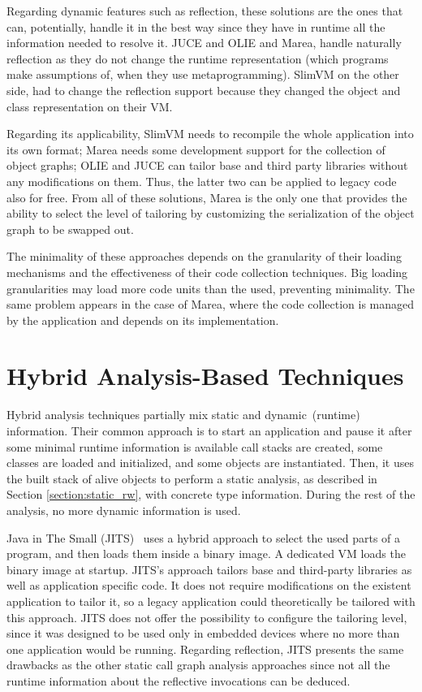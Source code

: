 Regarding dynamic features such as reflection, these solutions are the ones that can, potentially, handle it in the best way since they have in runtime all the information needed to resolve it. JUCE and OLIE and Marea, handle naturally reflection as they do not change the runtime representation (which programs make assumptions of, when they use metaprogramming). SlimVM on the other side, had to change the reflection support because they changed the object and class representation on their VM.

Regarding its applicability, SlimVM needs to recompile the whole application into its own format; Marea needs some development support for the collection of object graphs; OLIE and JUCE can tailor base and third party libraries without any modifications on them. Thus, the latter two can be applied to legacy code also for free. From all of these solutions, Marea is the only one that provides the ability to select the level of tailoring by customizing the serialization of the object graph to be swapped out.

The minimality of these approaches depends on the granularity of their loading mechanisms and the effectiveness of their code collection techniques. Big loading granularities may load more code units than the used, preventing minimality. The same problem appears in the case of Marea, where the code collection is managed by the application and depends on its implementation.

\section{Hybrid Analysis-Based Techniques}\label{section:hybrid_rw}

Hybrid analysis techniques partially mix static and dynamic~(\ie runtime) information. Their common approach is to start an application and pause it after some minimal runtime information is available \ie call stacks are created, some classes are loaded and initialized, and some objects are instantiated. Then, it uses the built stack of alive objects to perform a static analysis, as described in Section \ref{section:static_rw}, with concrete type information. During the rest of the analysis, no more dynamic information is used.

Java in The Small (JITS)~\cite{Cour10a} uses a hybrid approach to select the used parts of a program, and then loads them inside a binary image. A dedicated VM loads the binary image at startup. JITS's approach tailors base and third-party libraries as well as application specific code. It does not require modifications on the existent application to tailor it, so a legacy application could theoretically be tailored with this approach. JITS does not offer the possibility to configure the tailoring level, since it was designed to be used only in embedded devices where no more than one application would be running. Regarding reflection, JITS presents the same drawbacks as the other static call graph analysis approaches since not all the runtime information about the reflective invocations can be deduced.

